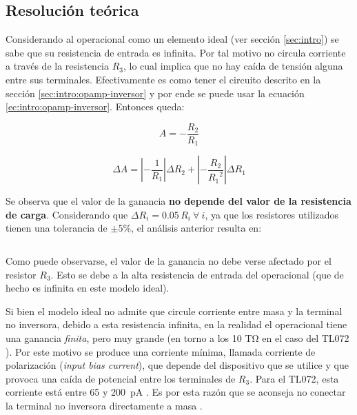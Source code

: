 \subsection{Resolución teórica}
\label{sec:1-teoria}

Considerando al operacional como un elemento ideal (ver sección \ref{sec:intro})
se sabe que su resistencia de entrada es infinita. Por tal motivo no circula
corriente a través de la resistencia $R_3$, lo cual implica que no hay caída
de tensión alguna entre sus terminales. Efectivamente es como tener el circuito
descrito en la sección \ref{sec:intro:opamp-inversor} y por ende se puede usar
la ecuación \ref{ec:intro:opamp-inversor}. Entonces queda:

\begin{equation}
    \label{ec:1-teoria:ganancia}
    A = -\frac{R_2}{R_1}
\end{equation}

\begin{equation}
    \label{ec:1-teoria:err-ganancia}
    \Delta A = \left| - \frac{1}{R_1} \right| \Delta R_2
             + \left| - \frac{R_2}{{R_1}^2} \right| \Delta R_1
\end{equation}

Se observa que el valor de la ganancia \textbf{no depende del valor de la
resistencia de carga}. Considerando que $\Delta R_i = 0.05\,R_i\ \forall\ i$, ya
que los resistores utilizados tienen una tolerancia de $\pm 5\%$, el análisis
anterior resulta en:

\[
    
\]

Como puede observarse, el valor de la ganancia no debe verse afectado por el
resistor $R_3$. Esto se debe a la alta resistencia de entrada del operacional
(que de hecho es infinita en este modelo ideal).

Si bien el modelo ideal no admite que circule corriente entre masa y la
terminal no inversora, debido a esta resistencia infinita, en la realidad
el operacional tiene una ganancia \textit{finita}, pero muy grande (en torno a
los 10 \si{\tera\ohm} en el caso del TL072 \cite[pág. 5]{datasheet-tl072}).
Por este motivo se produce una corriente mínima, llamada corriente de
polarización (\textit{input bias current}), que depende del dispositivo que se
utilice y que provoca una caída de potencial entre los terminales de $R_3$.
Para el TL072, esta corriente está entre 65 y \SI{200}{\pico\ampere} 
\cite[pág. 5]{datasheet-tl072}. Es por esta razón que se aconseja no
conectar la terminal no inversora directamente a masa \cite[pág. 252]{AOE}.
